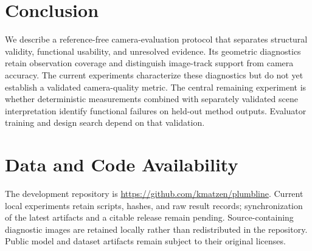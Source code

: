 \documentclass[10pt,twocolumn]{article}
\begin{document}
\section{Conclusion}
We describe a reference-free camera-evaluation protocol that separates structural validity, functional usability, and unresolved evidence. Its geometric diagnostics retain observation coverage and distinguish image-track support from camera accuracy. The current experiments characterize these diagnostics but do not yet establish a validated camera-quality metric. The central remaining experiment is whether deterministic measurements combined with separately validated scene interpretation identify functional failures on held-out method outputs. Evaluator training and design search depend on that validation.

\section*{Data and Code Availability}
The development repository is \url{https://github.com/kmatzen/plumbline}. Current local experiments retain scripts, hashes, and raw result records; synchronization of the latest artifacts and a citable release remain pending. Source-containing diagnostic images are retained locally rather than redistributed in the repository. Public model and dataset artifacts remain subject to their original licenses.



\end{document}
